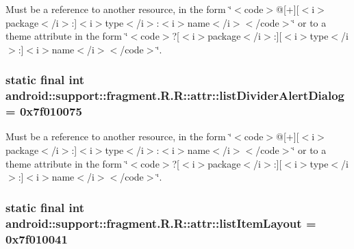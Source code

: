Must be a reference to another resource, in the form \char`\"{}$<$code$>$@\mbox{[}+\mbox{]}\mbox{[}$<$i$>$package$<$/i$>$:\mbox{]}$<$i$>$type$<$/i$>$:$<$i$>$name$<$/i$>$$<$/code$>$\char`\"{} or to a theme attribute in the form \char`\"{}$<$code$>$?\mbox{[}$<$i$>$package$<$/i$>$:\mbox{]}\mbox{[}$<$i$>$type$<$/i$>$:\mbox{]}$<$i$>$name$<$/i$>$$<$/code$>$\char`\"{}. \hypertarget{classandroid_1_1support_1_1fragment_1_1_r_1_1attr_c59fb2b24f7a7c5b83e5496d9a03aff2}{
\subsubsection[{listDividerAlertDialog}]{\setlength{\rightskip}{0pt plus 5cm}static final int android::support::fragment.R.R::attr::listDividerAlertDialog = 0x7f010075}}
\label{classandroid_1_1support_1_1fragment_1_1_r_1_1attr_c59fb2b24f7a7c5b83e5496d9a03aff2}


Must be a reference to another resource, in the form \char`\"{}$<$code$>$@\mbox{[}+\mbox{]}\mbox{[}$<$i$>$package$<$/i$>$:\mbox{]}$<$i$>$type$<$/i$>$:$<$i$>$name$<$/i$>$$<$/code$>$\char`\"{} or to a theme attribute in the form \char`\"{}$<$code$>$?\mbox{[}$<$i$>$package$<$/i$>$:\mbox{]}\mbox{[}$<$i$>$type$<$/i$>$:\mbox{]}$<$i$>$name$<$/i$>$$<$/code$>$\char`\"{}. \hypertarget{classandroid_1_1support_1_1fragment_1_1_r_1_1attr_b2f8d4e04103c96ac53cec6327116394}{
\subsubsection[{listItemLayout}]{\setlength{\rightskip}{0pt plus 5cm}static final int android::support::fragment.R.R::attr::listItemLayout = 0x7f010041}}
\label{classandroid_1_1support_1_1fragment_1_1_r_1_1attr_b2f8d4e04103c96ac53cec6327116394}


